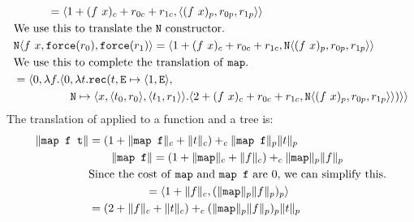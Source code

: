\begin{align*}
              &\qquad\quad = \langle 1 + (f\ x)_c + r_{0c} + r_{1c},\langle (f\ x)_p, r_{0p}, r_{1p}\rangle\rangle\\
              &\text{We use this to translate the \texttt{N} constructor.} \\
              &\texttt{N}\langle f\ x,\texttt{force}(r_0),\texttt{force}(r_1)\rangle = \langle 1 + (f\ x)_c + r_{0c} + r_{1c}, \texttt{N}\langle(f\ x)_p,r_{0p},r_{1p}\rangle\rangle \\
              &\text{We use this to complete the translation of \texttt{map}.} \\
              &= \langle 0,\lambda f.\langle 0,\lambda t.\texttt{rec}(t, \texttt{E} \mapsto \langle 1,\texttt{E}\rangle,\\
              &\qquad\quad\quad\quad \texttt{N} \mapsto \langle x,\langle t_0,r_0\rangle,\langle t_1,r_1\rangle\rangle.\langle 2 + (f\ x)_c + r_{0c} + r_{1c}, \texttt{N}\langle (f\ x)_p,r_{0p},r_{1p}\rangle\rangle)\rangle\rangle \\
\end{align*}
%
The translation of  applied to a function  and a tree  is:
%
\begin{align*}
  \|\texttt{map f t}\| &= (1 + \|\texttt{map f}\|_c + \|t\|_c) +_c \|\texttt{map f}\|_p \|t\|_p \\
                  &\qquad \|\texttt{map f}\| = (1 + \|\texttt{map}\|_c + \|f\|_c) +_c \|\texttt{map}\|_p \|f\|_p \\
                  &\text{Since the cost of \texttt{map} and \texttt{map f} are $0$, we can simplify this.} \\
                  &\qquad\quad\quad\quad = \langle 1 + \|f\|_c, (\|\texttt{map}\|_p \|f\|_p)_p \rangle \\
                  &= (2 + \|f\|_c + \|t\|_c) +_c (\|\texttt{map}\|_p \|f\|_p)_p \|t\|_p
\end{align*}
%


